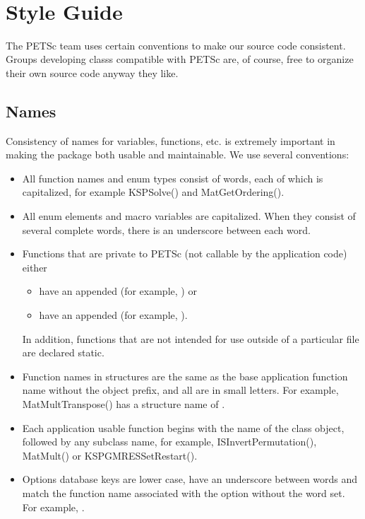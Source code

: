 \documentclass[twoside,12pt]{../sty/report_petsc}
\begin{document}
\newpage
\hbox{ }
\newpage

\tableofcontents

\chapter{Style Guide}

The PETSc team uses certain conventions to make our source code consistent. Groups
developing classs compatible with PETSc are, of course, free to organize their
own source code anyway they like.

\section{Names}
Consistency of names for variables, functions, etc. is extremely
important in making the package both usable and maintainable.
We use several conventions:
\begin{itemize}
\item All function names and enum types consist of words, each of
      which is capitalized, for example KSPSolve() and
      MatGetOrdering().
\item All enum elements and macro variables are capitalized. When
      they consist of several complete words, there is an underscore between each word.
\item Functions that are private to PETSc (not callable by the
      application code) either
      \begin{itemize}
        \item have an appended  (for example,
           ) or
        \item have an appended  (for example,
           ).
      \end{itemize}

      In addition, functions that are not intended for use outside
      of a particular file are declared static.
\item Function names in structures are the same as the base application
      function name without the object prefix, and all are in small letters.
      For example, MatMultTranspose() has a structure name of
      .
\item Each application usable function begins with the name of the class object, followed by any subclass name,
      for example, ISInvertPermutation(), MatMult() or KSPGMRESSetRestart().
\item Options database keys are lower case, have an underscore between words and match the function name associated with the option without the word set. For example, .
\end{itemize}
\end{document}

